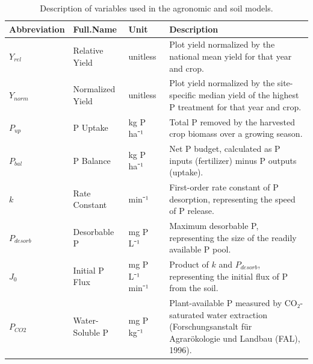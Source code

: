 \documentclass[
  a4paper,
]{article}
\begin{document}
\begin{longtable}[]{@{}
  >{\raggedright\arraybackslash}p{}
  >{\raggedright\arraybackslash}p{}
  >{\raggedright\arraybackslash}p{}
  >{\raggedright\arraybackslash}p{}@{}}

\caption{\label{tbl-variables}Description of variables used in the
agronomic and soil models.}

\tabularnewline

\toprule\noalign{}
\begin{minipage}[b]{\linewidth}\raggedright
Abbreviation
\end{minipage} & \begin{minipage}[b]{\linewidth}\raggedright
Full.Name
\end{minipage} & \begin{minipage}[b]{\linewidth}\raggedright
Unit
\end{minipage} & \begin{minipage}[b]{\linewidth}\raggedright
Description
\end{minipage} \\
\midrule\noalign{}
\endhead
\bottomrule\noalign{}
\endlastfoot
\(Y_{rel}\) & Relative Yield & unitless & Plot yield normalized by the
national mean yield for that year and crop. \\
\(Y_{norm}\) & Normalized Yield & unitless & Plot yield normalized by
the site-specific median yield of the highest P treatment for that year
and crop. \\
\(P_{up}\) & P Uptake & kg P ha⁻¹ & Total P removed by the harvested
crop biomass over a growing season. \\
\(P_{bal}\) & P Balance & kg P ha⁻¹ & Net P budget, calculated as P
inputs (fertilizer) minus P outputs (uptake). \\
\(k\) & Rate Constant & min⁻¹ & First-order rate constant of P
desorption, representing the speed of P release. \\
\(P_{desorb}\) & Desorbable P & mg P L⁻¹ & Maximum desorbable P,
representing the size of the readily available P pool. \\
\(J_0\) & Initial P Flux & mg P L⁻¹ min⁻¹ & Product of \(k\) and
\(P_{desorb}\), representing the initial flux of P from the soil. \\
\(P_{CO2}\) & Water-Soluble P & mg P kg⁻¹ & Plant-available P measured
by CO₂-saturated water extraction
(Forschungsanstalt für Agrarökologie und Landbau (FAL), 1996). \\

\end{longtable}
\end{document}
